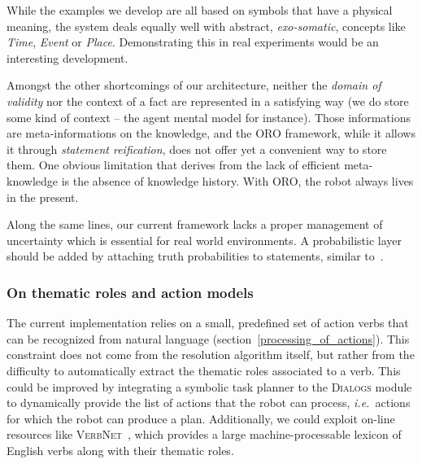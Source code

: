 \documentclass[twocolumn]{svjour3}
\newcommand{\ie}{{\textit{i.e.~}}}
\begin{document}
While the examples we develop are all based on symbols that have a physical
meaning, the system deals equally well with abstract, \emph{exo-somatic},
concepts like \emph{Time}, \emph{Event} or \emph{Place}. Demonstrating this in
real experiments would be an interesting development.

Amongst the other shortcomings of our architecture, neither the \emph{domain of
validity} nor the context of a fact are represented in a satisfying way (we do
store some kind of context -- the agent mental model for instance). Those
informations are meta-informations on the knowledge, and the ORO framework,
while it allows it through \emph{statement reification}, does not offer yet
a convenient way to store them. One obvious limitation that derives from
the lack of efficient meta-knowledge is the absence of knowledge history.
With ORO, the robot always lives in the present.

Along the same lines, our current framework lacks a proper management of
uncertainty which is essential for real world environments. A probabilistic
layer should be added by attaching truth probabilities to statements, similar
to~\cite{Jain2009}.

% 
% 
% 
% 
% 

\subsubsection{On thematic roles and action models}

The current implementation relies on a small, predefined set of action verbs that can
be recognized from natural language (section~\ref{processing_of_actions}).
This constraint does not come from the resolution algorithm itself, but
rather from the difficulty to automatically extract the thematic roles associated
to a verb. 
This could be improved by integrating a symbolic task
planner to the \textsc{Dialogs} module to dynamically provide the list of
actions that the robot can process, \ie actions for which the robot can produce
a plan. Additionally, we could exploit on-line resources like
\textsc{VerbNet}~\cite{Kipper2008}, which provides a large machine-processable
lexicon of English verbs along with their thematic roles.
\end{document}
